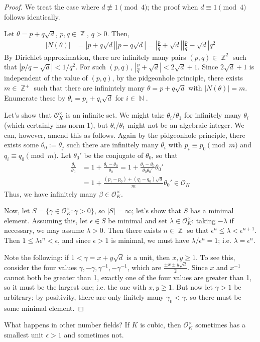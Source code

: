 \documentclass[11pt, a4paper]{memoir}
\DeclareMathOperator{\N}{{\mathbb{N}}}
\DeclareMathOperator{\Z}{{\mathbb{Z}}}
\theoremstyle{change}
\theoremstyle{plain}
\theoremstyle{nonumberplain}
\newtheorem{proof}{Proof}
\begin{document}
\begin{proof}
    We treat the case where $d\nequiv 1\pmod{4}$; the proof when $d\equiv 1\pmod{4}$ follows identically.

    Let $\theta=p+q\sqrt{d}$, $p,q\in\Z$, $q>0$.
    Then,
    \begin{align*}
        |N(\theta)| &= |p+q\sqrt{d}||p-q\sqrt{d}| = \left\lvert\frac{p}{q}+\sqrt{d}\right\rvert\left\lvert\frac{p}{q}-\sqrt{d}\right\rvert q^2
    \end{align*}
    By Dirichlet approximation, there are infinitely many pairs $(p,q)\in\Z^2$ such that $|p/q-\sqrt{d}|<1/q^2$.
    For such $(p,q)$, $\left\lvert\frac{p}{q}+\sqrt{d}\right\rvert<2\sqrt{d}+1$.
    Since $2\sqrt{d}+1$ is independent of the value of $(p,q)$, by the pidgeonhole principle, there exists $m\in\Z^+$ such that there are infinintely many $\theta=p+q\sqrt{d}$ with $|N(\theta)|=m$.
    Enumerate these by $\theta_i=p_i+q_i\sqrt{d}$ for $i\in\N$.

    Let's show that $\mathcal{O}_K^\times$ is an infinite set.
    We might take $\theta_i/\theta_1$ for infinitely many $\theta_i$ (which certainly has norm 1), but $\theta_i/\theta_1$ might not be an algebraic integer.
    We can, however, amend this as follows.
    Again by the pidgeonhole principle, there exists some $\theta_0:=\theta_j$ such there are infinitely many $\theta_i$ with $p_i\equiv p_0\pmod{m}$ and $q_i\equiv q_0\pmod{m}$.
    Let $\theta_0'$ be the conjugate of $\theta_0$, so that
    \begin{align*}
        \frac{\theta_i}{\theta_0} &= 1+\frac{\theta_i-\theta_0}{\theta_0}= 1+\frac{\theta_i-\theta_0}{\theta_0\theta_0'}\theta_0'\\
                                  &= 1+\frac{(p_i-p_0)+(q_i-q_0)\sqrt{d}}{m}\theta_0'\in\mathcal{O}_K
    \end{align*}
    Thus, we have infinitely many $\beta\in\mathcal{O}_K^\times$.

    Now, let $S=\{\gamma\in\mathcal{O}_K^\times:\gamma>0\}$, so $|S|=\infty$; let's show that $S$ has a minimal element.
    Assuming this, let $\epsilon\in S$ be minimal and set $\lambda\in\mathcal{O}_K^\times$: taking $-\lambda$ if necessary, we may assume $\lambda>0$.
    Then there exists $n\in\Z$ so that $\epsilon^n\leq\lambda<\epsilon^{n+1}$.
    Then $1\leq\lambda\epsilon^n<\epsilon$, and since $\epsilon>1$ is minimal, we must have $\lambda/\epsilon^n=1$; i.e. $\lambda=\epsilon^n$.

    Note the following: if $1<\gamma=x+y\sqrt{d}$ is a unit, then $x,y\geq 1$.
    To see this, consider the four values $\gamma,-\gamma,\gamma^{-1},-\gamma^{-1}$, which are $\frac{\pm x\pm y\sqrt{d}}{2}$.
    Since $x$ and $x^{-1}$ cannot both be greater than 1, exactly one of the four values are greater than 1, so it must be the largest one; i.e. the one with $x,y\geq 1$.
    But now let $\gamma>1$ be arbitrary; by positivity, there are only finitely many $\gamma_0<\gamma$, so there must be some minimal element.
\end{proof}
What happens in other number fields?
If $K$ is cubic, then $\mathcal{O}_K^\times$ sometimes has a smallest unit $\epsilon>1$ and sometimes not.
\end{document}
